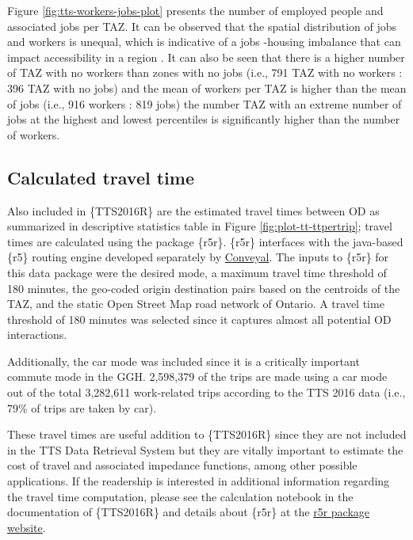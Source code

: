 \documentclass[Royal,times,sageh]{sagej}
\begin{document}
Figure \ref{fig:tts-workers-jobs-plot} presents the number of employed
people and associated jobs per TAZ. It can be observed that the spatial
distribution of jobs and workers is unequal, which is indicative of a
jobs -housing imbalance that can impact accessibility in a region
\citep{Levine1998rethinking}. It can also be seen that there is a higher
number of TAZ with no workers than zones with no jobs (i.e., 791 TAZ
with no workers : 396 TAZ with no jobs) and the mean of workers per TAZ
is higher than the mean of jobs (i.e., 916 workers : 819 jobs) the
number TAZ with an extreme number of jobs at the highest and lowest
percentiles is significantly higher than the number of workers.

\hypertarget{calculated-travel-time}{%
\subsection{Calculated travel time}\label{calculated-travel-time}}

Also included in \{TTS2016R\} are the estimated travel times between OD
as summarized in descriptive statistics table in Figure
\ref{fig:plot-tt-ttpertrip}; travel times are calculated using the
package \{r5r\}. \{r5r\} interfaces with the java-based \{r5\} routing
engine developed separately by \href{https://conveyal.com/}{Conveyal}.
The inputs to \{r5r\} for this data package were the desired mode, a
maximum travel time threshold of 180 minutes, the geo-coded origin
destination pairs based on the centroids of the TAZ, and the static Open
Street Map road network of Ontario. A travel time threshold of 180
minutes was selected since it captures almost all potential OD
interactions.

Additionally, the car mode was included since it is a critically
important commute mode in the GGH. 2,598,379 of the trips are made using
a car mode out of the total 3,282,611 work-related trips according to
the TTS 2016 data (i.e., 79\% of trips are taken by car).

These travel times are useful addition to \{TTS2016R\} since they are
not included in the TTS Data Retrieval System but they are vitally
important to estimate the cost of travel and associated impedance
functions, among other possible applications. If the readership is
interested in additional information regarding the travel time
computation, please see the calculation notebook in the documentation of
\{TTS2016R\} and details about \{r5r\} at the
\href{https://ipeagit.github.io/r5r/index.html}{r5r package website}.
\end{document}
